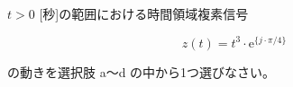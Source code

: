 $t > 0$ [秒]の範囲における時間領域複素信号 

\[
z(t) = t^3 \cdot \textrm{e}^{\{j \cdot \pi/4 \}}
\]

\medskip
\noindent の動きを選択肢 a〜d の中から1つ選びなさい。
